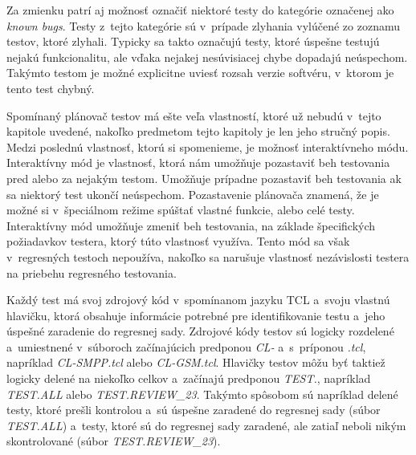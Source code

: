 Za zmienku patrí aj možnosť označiť niektoré testy do kategórie označenej ako {\it known bugs}.
Testy z~tejto kategórie sú v~prípade zlyhania vylúčené zo zoznamu testov, ktoré zlyhali.
Typicky sa takto označujú testy, ktoré úspešne testujú nejakú funkcionalitu, ale vďaka nejakej nesúvisiacej chybe 
dopadajú neúspechom. Takýmto testom je možné explicitne uviesť rozsah verzie softvéru, v~ktorom je tento test chybný.

Spomínaný plánovač testov má ešte veľa vlastností, ktoré už nebudú v~tejto kapitole uvedené, nakoľko predmetom tejto
kapitoly je len jeho stručný popis. Medzi poslednú vlastnosť, ktorú si spomenieme, je možnosť interaktívneho módu.
Interaktívny mód je vlastnosť, ktorá nám umožňuje pozastaviť beh testovania pred alebo za nejakým testom.
Umožňuje prípadne pozastaviť beh testovania ak sa niektorý test ukončí neúspechom. Pozastavenie plánovača znamená,
že je možné si v~špeciálnom režime spúštať vlastné funkcie, alebo celé testy.
Interaktívny mód umožňuje zmeniť beh testovania, na základe špecifických požiadavkov testera, ktorý túto vlastnosť využíva.
Tento mód sa však v~regresných testoch nepoužíva, nakoľko sa narušuje vlastnosť nezávislosti testera na priebehu regresného testovania.

Každý test má svoj zdrojový kód v~spomínanom jazyku TCL a~svoju vlastnú hlavičku, ktorá obsahuje informácie potrebné pre identifikovanie testu a~jeho úspešné zaradenie do regresnej sady.
Zdrojové kódy testov sú logicky rozdelené a~umiestnené v~súboroch začínajúcich predponou {\it CL-} a~s~príponou {\it .tcl}, napríklad {\it CL-SMPP.tcl} alebo {\it CL-GSM.tcl}.
Hlavičky testov môžu byť taktiež logicky delené na niekoľko celkov a~začínajú predponou {\it TEST.}, napríklad {\it TEST.ALL} alebo {\it TEST.REVIEW\_23}.
Takýmto spôsobom sú napríklad delené testy, ktoré prešli kontrolou a~sú úspešne zaradené do regresnej sady (súbor {\it TEST.ALL}) a~testy, ktoré sú do regresnej sady zaradené, ale
zatiaľ neboli nikým skontrolované (súbor {\it TEST.REVIEW\_23}).

